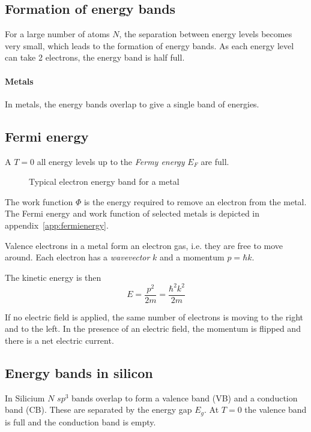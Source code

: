 \subsection{Formation of energy bands}
For a large number of atoms $N$, the separation between energy levels becomes very small, which leads to the formation of energy bands.
As each energy level can take 2 electrons, the energy band is half full.

\paragraph{Metals}
In metals, the energy bands overlap to give a single band of energies.

\subsection{Fermi energy}
A $T=0$ all energy levels up to the \emph{Fermy energy} $E_F$ are full. 

\begin{figure}[ht!]
    \centering
    
    \caption{Typical electron energy band for a metal}
\end{figure}

The work function $\Phi$ is the energy required to remove an electron from the metal. 
The Fermi energy and work function of selected metals is depicted in appendix~\ref{app:fermienergy}.

Valence electrons in a metal form an electron gas, i.e. they are free to move around. 
Each electron has a \emph{wavevector} $k$ and a momentum $p = \hbar k$.

The kinetic energy is then
\begin{equation}
    E = \frac{p^2}{2m} = \frac{\hbar^2 k^2}{2m}
\end{equation}

If no electric field is applied, the same number of electrons is moving to the right
and to the left. 
In the presence of an electric field, the momentum is flipped and there is a
net electric current.

\subsection{Energy bands in silicon}
In Silicium $N$ $sp^3$ bands overlap to form a valence band (VB) and a conduction band (CB).  
These are separated by the energy gap $E_g$.
At $T=0$ the valence band is full and the conduction band is empty.

